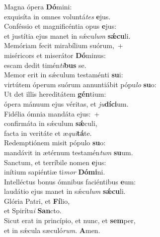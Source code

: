 \evenverse Magna ópera \textbf{Dó}mini:~\*\\
\evenverse exquisíta in omnes voluntá\textit{tes} \textbf{e}jus.\\
\oddverse Conféssio et magnificéntia opus \textbf{e}jus:~\*\\
\oddverse et justítia ejus manet in sǽcu\textit{lum} \textbf{sǽ}\textbf{cu}li.\\
\evenverse Memóriam fecit mirabílium suórum,~+\\
\evenverse  miséricors et miserátor \textbf{Dó}minus:~\*\\
\evenverse escam dedit timén\textit{ti}\textbf{bus} se.\\
\oddverse Memor erit in sǽculum testaménti \textbf{su}i:~\*\\
\oddverse virtútem óperum suórum annuntiábit pópu\textit{lo} \textbf{su}o:\\
\evenverse Ut det illis hereditátem \textbf{gén}tium:~\*\\
\evenverse ópera mánuum ejus véritas, et \textit{ju}\textbf{dí}\textbf{ci}um.\\
\oddverse Fidélia ómnia mandáta ejus:~+\\
\oddverse  confirmáta in sǽculum \textbf{sǽ}culi,~\*\\
\oddverse facta in veritáte et æ\textit{qui}\textbf{tá}te.\\
\evenverse Redemptiónem misit pópulo \textbf{su}o:~\*\\
\evenverse mandávit in ætérnum testamén\textit{tum} \textbf{su}um.\\
\oddverse Sanctum, et terríbile nomen \textbf{e}jus:~\*\\
\oddverse inítium sapiéntiæ ti\textit{mor} \textbf{Dó}\textbf{mi}ni.\\
\evenverse Intelléctus bonus ómnibus faciéntibus \textbf{e}um:~\*\\
\evenverse laudátio ejus manet in sǽcu\textit{lum} \textbf{sǽ}\textbf{cu}li.\\
\oddverse Glória Patri, et \textbf{Fí}lio,~\*\\
\oddverse et Spirítu\textit{i} \textbf{San}cto.\\
\evenverse Sicut erat in princípio, et nunc, et \textbf{sem}per,~\*\\
\evenverse et in sǽcula sæculó\textit{rum}. \textbf{A}men.\\
